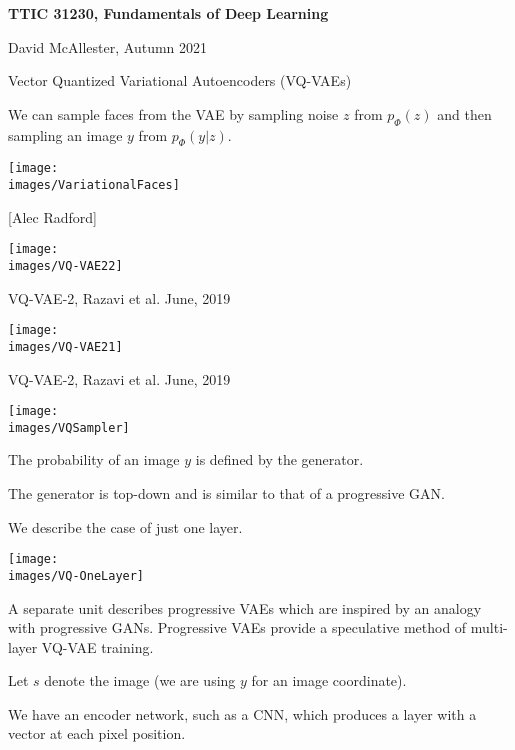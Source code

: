 





{\Huge

  \centerline{\bf TTIC 31230, Fundamentals of Deep Learning}
  \bigskip
  \centerline{David McAllester, Autumn 2021}
  \vfill
  \vfil
  \centerline{Vector Quantized Variational Autoencoders (VQ-VAEs)}
  \vfill
  \vfill


We can sample faces from the VAE by sampling noise $z$ from $p_\Phi(z)$ and then sampling an image $y$ from $p_\Phi(y|z)$.

\vfill
\centerline{\texttt{[image: \\images/VariationalFaces]}}
\centerline{[Alec Radford]}


\centerline{\texttt{[image: \\images/VQ-VAE22]}}

\vfill
VQ-VAE-2, Razavi et al. June, 2019


\centerline{\texttt{[image: \\images/VQ-VAE21]}}

\vfill
VQ-VAE-2, Razavi et al. June, 2019





\centerline{\texttt{[image: \\images/VQSampler]}}

\vfill
The probability of an image $y$ is defined by the generator.

\vfill
The generator is top-down and is similar to that of a progressive GAN.



We describe the case of just one layer.

\vfill
\centerline{\texttt{[image: \\images/VQ-OneLayer]}}

\vfill
A separate unit describes progressive VAEs which are inspired by an analogy with progressive GANs.  Progressive VAEs provide a speculative method
of multi-layer VQ-VAE training.


Let $s$ denote the image (we are using $y$ for an image coordinate).

\vfill
We have an encoder network, such as a CNN, which produces a layer with a vector at each pixel position.

}
